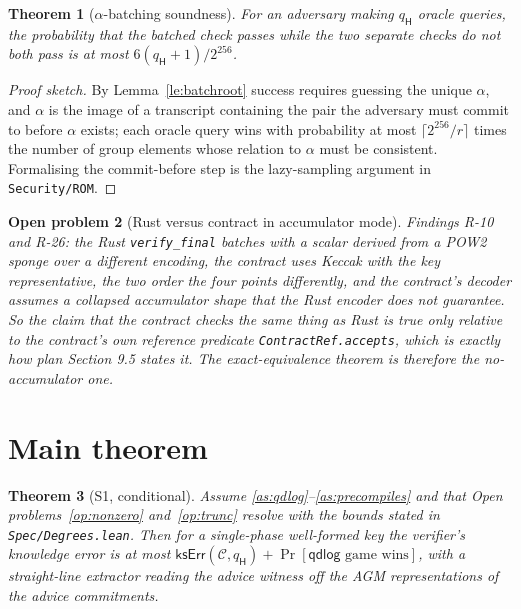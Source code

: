 \documentclass[11pt]{article}
\newtheorem{theorem}{Theorem}[section]
\newtheorem{open}[theorem]{Open problem}
\newcommand{\Hash}{\mathsf{H}}
\begin{document}
\begin{theorem}[$\alpha$-batching soundness]\label{th:alpha}
For an adversary making $q_{\Hash}$ oracle queries, the probability that the
batched check passes while the two separate checks do not both pass is at most
$6(q_{\Hash}+1)/2^{256}$.
\end{theorem}
\begin{proof}[Proof sketch]
By Lemma~\ref{le:batchroot} success requires guessing the unique $\alpha$, and
$\alpha$ is the image of a transcript containing the pair the adversary must commit
to before $\alpha$ exists; each oracle query wins with probability at most
$\lceil 2^{256}/r\rceil$ times the number of group elements whose relation to
$\alpha$ must be consistent. Formalising the commit-before step is the lazy-sampling
argument in \texttt{Security/ROM}.
\end{proof}

\begin{open}[Rust versus contract in accumulator mode]\label{op:acc}
Findings R-10 and R-26: the Rust \texttt{verify\_final} batches with a scalar
derived from a POW2 sponge over a different encoding, the contract uses Keccak with
the key representative, the two order the four points differently, and the
contract's decoder assumes a \emph{collapsed} accumulator shape that the Rust
encoder does not guarantee. So the claim that the contract checks the same thing as
Rust is true only relative to the contract's own reference predicate
\texttt{ContractRef.accepts}, which is exactly how plan Section 9.5 states it. The
exact-equivalence theorem is therefore the no-accumulator one.
\end{open}

\section{Main theorem}\label{sec:main}

\begin{theorem}[S1, conditional]\label{th:s1}
Assume \ref{as:qdlog}--\ref{as:precompiles} and that Open
problems~\ref{op:nonzero} and~\ref{op:trunc} resolve with the bounds stated in
\texttt{Spec/Degrees.lean}. Then for a single-phase well-formed key the verifier's
knowledge error is at most $\mathsf{ksErr}(\mathcal{C}, q_{\Hash}) +
\Pr[\mathsf{qdlog}\text{ game wins}]$, with a straight-line extractor reading the
advice witness off the AGM representations of the advice commitments.
\end{theorem}
\end{document}

